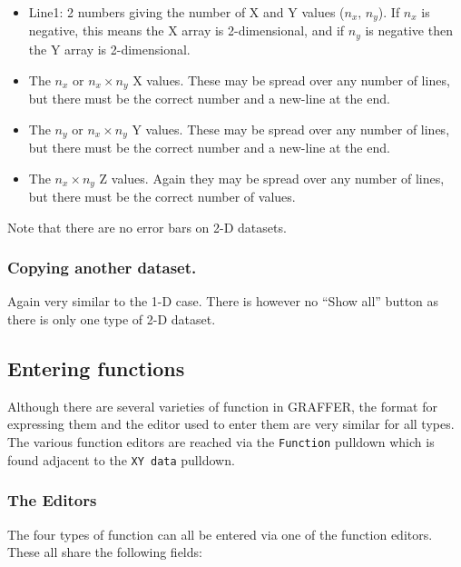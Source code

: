 \documentclass[11pt,twoside,english]{article}
\begin{document}
\begin{itemize}
\item Line1: 2 numbers giving the number of X and Y values ($n_{x},\,
  n_{y}$). If $n_x$ is negative, this means the X array is
  2-dimensional, and if $n_y$ is negative then the Y array is
  2-dimensional.
\item The $n_{x}$ or $n_x \times n_y$ X values. These may be spread
  over any number of lines, but there must be the correct number and a
  new-line at the end.
\item The $n_{y}$ or $n_x \times n_y$ Y values. These may be spread
  over any number of lines, but there must be the correct number and a
  new-line at the end.
\item The $n_{x}\times n_{y}$ Z values. Again they may be spread over
  any number of lines, but there must be the correct number of values.
\end{itemize}
Note that there are no error bars on 2-D datasets.

\subsubsection{Copying another dataset.}
\label{sec:zcopy}

Again very similar to the 1-D case. There is however no ``Show all''
button as there is only one type of 2-D dataset.

\subsection{Entering functions\label{enter-fun}}

Although there are several varieties of function in GRAFFER, the format
for expressing them and the editor used to enter them are very similar
for all types. The various function editors are reached via the
\texttt{Function} pulldown which is found adjacent to the \texttt{XY
  data} pulldown.


\subsubsection{The Editors }

The four types of function can all be entered via one of the function
editors. These all share the following fields:
\end{document}
